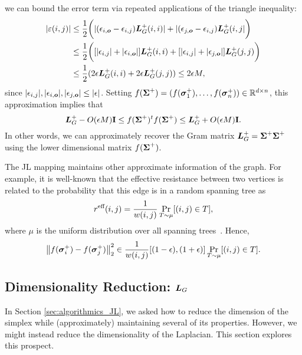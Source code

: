 we can bound the error term via repeated applications of the triangle inequality: 
\begin{align*}
|\varepsilon(i,j)|& \leq \frac{1}{2}\bigg(|(\epsilon_{i,\vb*{o}}-\epsilon_{i,j})\vb*{L}_G^+(i,i)| + |(\epsilon_{j,\vb*{o}}-\epsilon_{i,j})\vb*{L}_G^+(i,j|\bigg) \\
& \leq \frac{1}{2}\bigg([|\epsilon_{i,j}|+|\epsilon_{i,\vb*{o}}|]\vb*{L}_G^+(i,i) + [|\epsilon_{i,j}|+|\epsilon_{j,\vb*{o}}|]\vb*{L}_G^+(j,j)\bigg) \\
&\leq \frac{1}{2} ( 2\epsilon\vb*{L}_G^+(i,i) + 2\epsilon\vb*{L}_G^+(j,j) ) \leq 2\epsilon M,
\end{align*}
since $|\epsilon_{i,j}|, |\epsilon_{i,\vb*{o}}|,|\epsilon_{j,\vb*{o}}|\leq |\epsilon|$. Setting $f(\boldsymbol{\Sigma}^+) = (f(\vb*{\sigma}_1^+),\dots,f(\vb*{\sigma}_n^+))\in \mathbb{R}^{d\times n}$, this approximation implies that 
\begin{equation*}
\vb*{L}_G^+ - O(\epsilon M)\vb{I} \leq f(\boldsymbol{\Sigma}^+)^t f(\boldsymbol{\Sigma}^+) \leq \vb*{L}_G^+ + O(\epsilon M)\vb{I}. 
\end{equation*}
In other words, we can approximately recover the Gram matrix $\vb*{L}_G^+=\boldsymbol{\Sigma}^+\boldsymbol{\Sigma}^+$ using the lower dimensional matrix $f(\boldsymbol{\Sigma}^+)$. 

The JL mapping maintains other approximate information of the graph.  For  example,  it is well-known that the effective resistance between two vertices is related to the probability that this edge  is in a random  spanning  tree as 
\begin{equation*}
	r^{\textnormal{eff}}(i,j) = \frac{1}{w(i,j)} \Pr_{T\sim \mu}[(i,j)\in T],
\end{equation*}
where $\mu$ is the uniform distribution over all spanning trees~\cite{burton1993local}. Hence, 
\begin{equation*}
\norm{f(\vb*{\sigma}_i^+)-f(\vb*{\sigma}_j^+)}_2^2 \in \frac{1}{w(i,j)}[(1-\epsilon),(1+\epsilon)]\Pr_{T\sim \mu}[(i,j)\in T].
\end{equation*}
	

\subsection{Dimensionality Reduction: \texorpdfstring{$\vb*{L}_G$}{the Laplacian}}
\label{sec:algorithmics_low_rank}
In Section  \ref{sec:algorithmics_JL}, we asked how to reduce the  dimension of the  simplex  while (approximately) maintaining several of its  properties. However,  we might instead  reduce the dimensionality of the  Laplacian. This section explores this prospect. 


